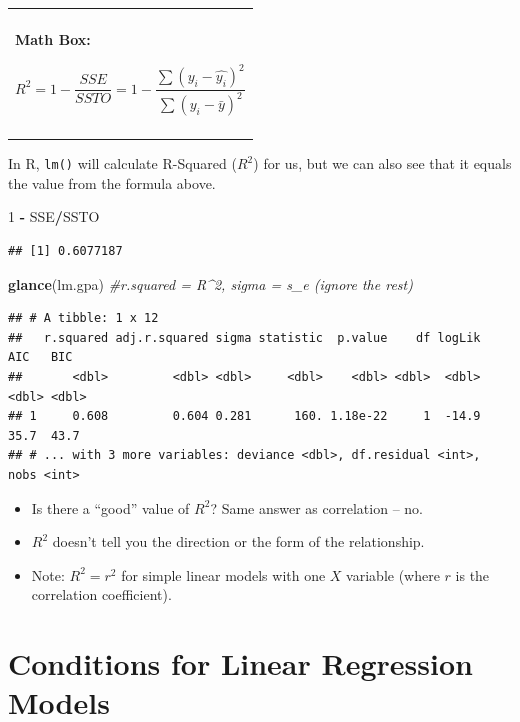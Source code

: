 \documentclass[
]{book}
\newenvironment{Shaded}{\begin{snugshade}}{\end{snugshade}}
\newcommand{\CommentTok}[1]{\textcolor[rgb]{0.56,0.35,0.01}{\textit{#1}}}
\newcommand{\DecValTok}[1]{\textcolor[rgb]{0.00,0.00,0.81}{#1}}
\newcommand{\KeywordTok}[1]{\textcolor[rgb]{0.13,0.29,0.53}{\textbf{#1}}}
\newcommand{\NormalTok}[1]{#1}
\newcommand{\OperatorTok}[1]{\textcolor[rgb]{0.81,0.36,0.00}{\textbf{#1}}}
\newcommand{\StringTok}[1]{\textcolor[rgb]{0.31,0.60,0.02}{#1}}
\newenvironment{mathbox}
{
    \begin{center}
    
    \begin{tabular}{|p{0.8\textwidth}|}
    \rowcolor{LightYellow}
    \hline\\
    \rowcolor{LightYellow}
    \textbf{Math Box:}
}
{
    \\\rowcolor{LightYellow}
    \\\hline
    \end{tabular} 
    \end{center}
}
\begin{document}
\begin{mathbox}
\[ R^2 = 1 - \frac{SSE}{SSTO} = 1 - \frac{ \sum{(y_i - \hat{y_i})^2}}{ \sum{(y_i - \bar{y})^2}}\]
\end{mathbox}

In R, \texttt{lm()} will calculate R-Squared (\(R^2\)) for us, but we can also see that it equals the value from the formula above.

\begin{Shaded}
\begin{Highlighting}[]
\DecValTok{1} \OperatorTok{-}\StringTok{ }\NormalTok{SSE}\OperatorTok{/}\NormalTok{SSTO}
\end{Highlighting}
\end{Shaded}

\begin{verbatim}
## [1] 0.6077187
\end{verbatim}

\begin{Shaded}
\begin{Highlighting}[]
\KeywordTok{glance}\NormalTok{(lm.gpa) }\CommentTok{#r.squared = R^2, sigma = s_e (ignore the rest)}
\end{Highlighting}
\end{Shaded}

\begin{verbatim}
## # A tibble: 1 x 12
##   r.squared adj.r.squared sigma statistic  p.value    df logLik   AIC   BIC
##       <dbl>         <dbl> <dbl>     <dbl>    <dbl> <dbl>  <dbl> <dbl> <dbl>
## 1     0.608         0.604 0.281      160. 1.18e-22     1  -14.9  35.7  43.7
## # ... with 3 more variables: deviance <dbl>, df.residual <int>, nobs <int>
\end{verbatim}

\begin{itemize}
\item
  Is there a ``good'' value of \(R^2\)? Same answer as correlation -- no.
\item
  \(R^2\) doesn't tell you the direction or the form of the relationship.
\item
  Note: \(R^2 = r^2\) for simple linear models with one \(X\) variable (where \(r\) is the correlation coefficient).
\end{itemize}

\hypertarget{conditions-for-linear-regression-models}{%
\section{Conditions for Linear Regression Models}\label{conditions-for-linear-regression-models}}
\end{document}
